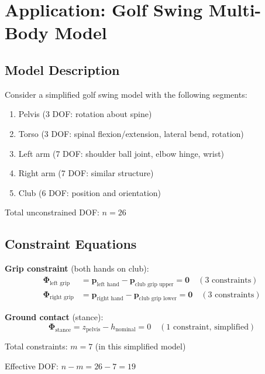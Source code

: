 \documentclass[11pt,a4paper]{article}
\theoremstyle{definition}
\newcommand{\Phivec}{\bm{\Phi}}
\begin{document}
\section{Application: Golf Swing Multi-Body Model}

\subsection{Model Description}

Consider a simplified golf swing model with the following segments:
\begin{enumerate}[noitemsep]
    \item Pelvis (3 DOF: rotation about spine)
    \item Torso (3 DOF: spinal flexion/extension, lateral bend, rotation)
    \item Left arm (7 DOF: shoulder ball joint, elbow hinge, wrist)
    \item Right arm (7 DOF: similar structure)
    \item Club (6 DOF: position and orientation)
\end{enumerate}

Total unconstrained DOF: $n = 26$

\subsection{Constraint Equations}

\textbf{Grip constraint} (both hands on club):
\begin{align}
    \Phivec_{\text{left grip}} &= \bm{p}_{\text{left hand}} - \bm{p}_{\text{club grip upper}} = \bm{0} \quad (3 \text{ constraints}) \\
    \Phivec_{\text{right grip}} &= \bm{p}_{\text{right hand}} - \bm{p}_{\text{club grip lower}} = \bm{0} \quad (3 \text{ constraints})
\end{align}

\textbf{Ground contact} (stance):
\begin{equation}
    \Phivec_{\text{stance}} = z_{\text{pelvis}} - h_{\text{nominal}} = 0 \quad (1 \text{ constraint, simplified})
\end{equation}

Total constraints: $m = 7$ (in this simplified model)

Effective DOF: $n - m = 26 - 7 = 19$
\end{document}
